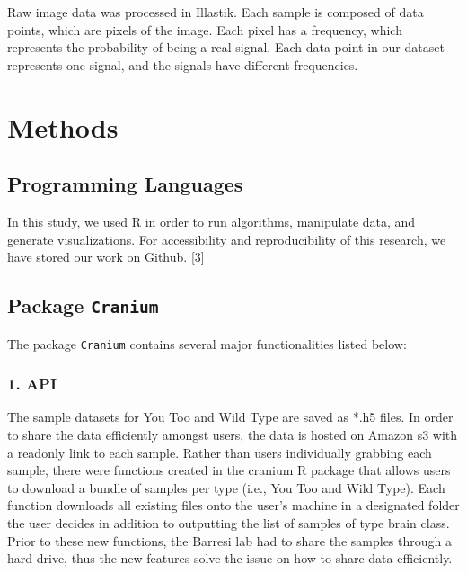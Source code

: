 \documentclass[10pt,letterpaper]{article}
\begin{document}
Raw image data was processed in Illastik. Each sample is composed of
data points, which are pixels of the image. Each pixel has a frequency,
which represents the probability of being a real signal. Each data point
in our dataset represents one signal, and the signals have different
frequencies.

\hypertarget{methods}{%
\section{Methods}\label{methods}}

\hypertarget{programming-languages}{%
\subsection{Programming Languages}\label{programming-languages}}

In this study, we used R in order to run algorithms, manipulate data,
and generate visualizations. For accessibility and reproducibility of
this research, we have stored our work on Github. {[}3{]}

\hypertarget{package-cranium}{%
\subsection{\texorpdfstring{Package
\texttt{Cranium}}{Package Cranium}}\label{package-cranium}}

The package \texttt{Cranium} contains several major functionalities
listed below:

\hypertarget{api}{%
\subsubsection{1. API}\label{api}}

The sample datasets for You Too and Wild Type are saved as *.h5 files.
In order to share the data efficiently amongst users, the data is hosted
on Amazon s3 with a readonly link to each sample. Rather than users
individually grabbing each sample, there were functions created in the
cranium R package that allows users to download a bundle of samples per
type (i.e., You Too and Wild Type). Each function downloads all existing
files onto the user's machine in a designated folder the user decides in
addition to outputting the list of samples of type brain class. Prior to
these new functions, the Barresi lab had to share the samples through a
hard drive, thus the new features solve the issue on how to share data
efficiently.
\end{document}
